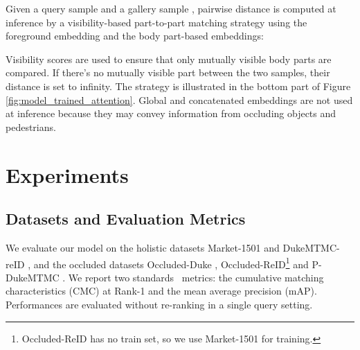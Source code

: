 \documentclass[10pt,twocolumn,letterpaper]{article}
\begin{document}
Given a query sample  and a gallery sample , pairwise distance is computed at inference by a visibility-based part-to-part matching strategy using the foreground embedding and the body part-based embeddings:
{\small{

}}
Visibility scores  are used to ensure that only mutually visible body parts are compared.
If there's no mutually visible part between the two samples, their distance is set to infinity.
The strategy is illustrated in the bottom part of Figure \ref{fig:model_trained_attention}.
Global and concatenated embeddings are not used at inference because they may convey information from occluding objects and pedestrians.








 
\section{Experiments} \label{section:experiments}








\subsection{Datasets and Evaluation Metrics} \label{section:datasets}
We evaluate our model on the holistic datasets Market-1501 \cite{market1501} and DukeMTMC-reID \cite{duke-mtmc}, and the occluded datasets Occluded-Duke \cite{PGFA}, Occluded-ReID\footnote{Occluded-ReID has no train set, so we use Market-1501 for training.} \cite{Zhuo2018} and P-DukeMTMC \cite{Zhuo2018}.
We report two standards \reid\ metrics: the cumulative matching characteristics (CMC) at Rank-1 and the mean average precision (mAP). 
Performances are evaluated without re-ranking \cite{re-rank} in a single query setting.
\end{document}
